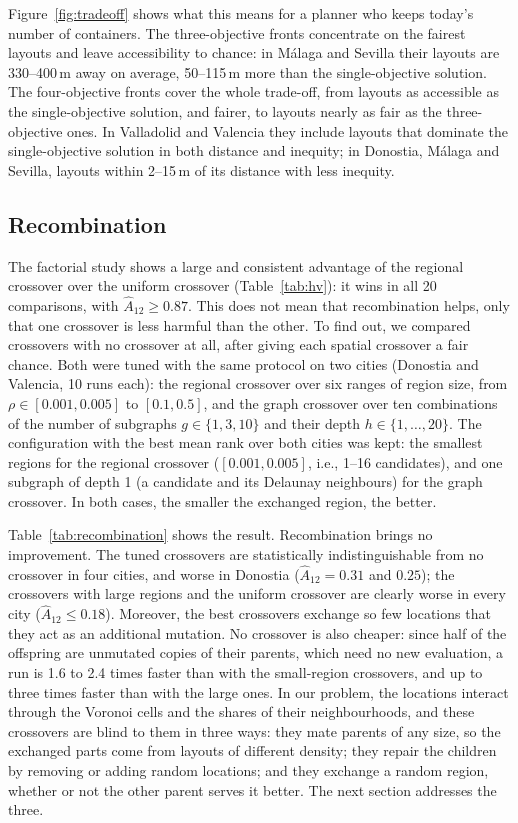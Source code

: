 Figure~\ref{fig:tradeoff} shows what this means for a planner who keeps today's number of containers. The three-objective fronts concentrate on the fairest layouts and leave accessibility to chance: in Málaga and Sevilla their layouts are 330--400\,m away on average, 50--115\,m more than the single-objective solution. The four-objective fronts cover the whole trade-off, from layouts as accessible as the single-objective solution, and fairer, to layouts nearly as fair as the three-objective ones. In Valladolid and Valencia they include layouts that dominate the single-objective solution in both distance and inequity; in Donostia, Málaga and Sevilla, layouts within 2--15\,m of its distance with less inequity.

\subsection{Recombination}
\label{sec:recombination}
The factorial study shows a large and consistent advantage of the regional crossover over the uniform crossover (Table~\ref{tab:hv}): it wins in all 20 comparisons, with $\hat{A}_{12} \geq 0.87$. This does not mean that recombination helps, only that one crossover is less harmful than the other. To find out, we compared crossovers with no crossover at all, after giving each spatial crossover a fair chance. Both were tuned with the same protocol on two cities (Donostia and Valencia, 10 runs each): the regional crossover over six ranges of region size, from $\rho \in [0.001, 0.005]$ to $[0.1, 0.5]$, and the graph crossover over ten combinations of the number of subgraphs $g \in \{1, 3, 10\}$ and their depth $h \in \{1, \dots, 20\}$. The configuration with the best mean rank over both cities was kept: the smallest regions for the regional crossover ($[0.001, 0.005]$, i.e., 1--16 candidates), and one subgraph of depth 1 (a candidate and its Delaunay neighbours) for the graph crossover. In both cases, the smaller the exchanged region, the better.



Table~\ref{tab:recombination} shows the result. Recombination brings no improvement. The tuned crossovers are statistically indistinguishable from no crossover in four cities, and worse in Donostia ($\hat{A}_{12} = 0.31$ and $0.25$); the crossovers with large regions and the uniform crossover are clearly worse in every city ($\hat{A}_{12} \leq 0.18$). Moreover, the best crossovers exchange so few locations that they act as an additional mutation. No crossover is also cheaper: since half of the offspring are unmutated copies of their parents, which need no new evaluation, a run is 1.6 to 2.4 times faster than with the small-region crossovers, and up to three times faster than with the large ones. In our problem, the locations interact through the Voronoi cells and the shares of their neighbourhoods, and these crossovers are blind to them in three ways: they mate parents of any size, so the exchanged parts come from layouts of different density; they repair the children by removing or adding random locations; and they exchange a random region, whether or not the other parent serves it better. The next section addresses the three.

